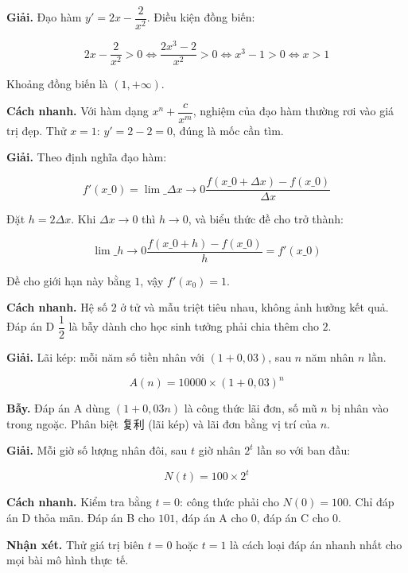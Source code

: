 \documentclass[11pt, a4paper]{article}
\begin{document}
\begin{dapan}[10 — Đáp án C]
\textbf{Giải.} Đạo hàm $y' = 2x - \dfrac{2}{x^2}$. Điều kiện đồng biến:

$$2x - \frac{2}{x^2} > 0 \iff \frac{2x^3 - 2}{x^2} > 0 \iff x^3 - 1 > 0 \iff x > 1$$

Khoảng đồng biến là $(1, +\infty)$.

\textbf{Cách nhanh.} Với hàm dạng $x^n + \dfrac{c}{x^m}$, nghiệm của đạo hàm thường rơi vào giá trị đẹp. Thử $x = 1$: $y' = 2 - 2 = 0$, đúng là mốc cần tìm.
\end{dapan}

\begin{dapan}[11 — Đáp án A]
\textbf{Giải.} Theo định nghĩa đạo hàm:

$$f'(x\_0) = \lim\_{\Delta x \to 0} \frac{f(x\_0 + \Delta x) - f(x\_0)}{\Delta x}$$

Đặt $h = 2\Delta x$. Khi $\Delta x \to 0$ thì $h \to 0$, và biểu thức đề cho trở thành:

$$\lim\_{h \to 0} \frac{f(x\_0 + h) - f(x\_0)}{h} = f'(x\_0)$$

Đề cho giới hạn này bằng $1$, vậy $f'(x_0) = 1$.

\textbf{Cách nhanh.} Hệ số $2$ ở tử và mẫu triệt tiêu nhau, không ảnh hưởng kết quả. Đáp án D $\dfrac{1}{2}$ là bẫy dành cho học sinh tưởng phải chia thêm cho $2$.
\end{dapan}

\begin{dapan}[12 — Đáp án D]
\textbf{Giải.} Lãi kép: mỗi năm số tiền nhân với $(1 + 0{,}03)$, sau $n$ năm nhân $n$ lần.

$$A(n) = 10000 \times (1 + 0{,}03)^n$$

\textbf{Bẫy.} Đáp án A dùng $(1 + 0{,}03n)$ là công thức lãi đơn, số mũ $n$ bị nhân vào trong ngoặc. Phân biệt 复利 (lãi kép) và lãi đơn bằng vị trí của $n$.
\end{dapan}

\begin{dapan}[13 — Đáp án D]
\textbf{Giải.} Mỗi giờ số lượng nhân đôi, sau $t$ giờ nhân $2^t$ lần so với ban đầu:

$$N(t) = 100 \times 2^t$$

\textbf{Cách nhanh.} Kiểm tra bằng $t = 0$: công thức phải cho $N(0) = 100$. Chỉ đáp án D thỏa mãn. Đáp án B cho $101$, đáp án A cho $0$, đáp án C cho $0$.

\textbf{Nhận xét.} Thử giá trị biên $t = 0$ hoặc $t = 1$ là cách loại đáp án nhanh nhất cho mọi bài mô hình thực tế.
\end{dapan}
\end{document}
